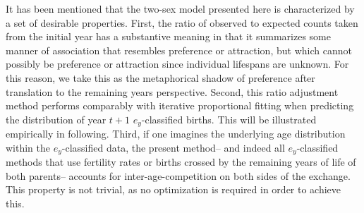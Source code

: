 
It has been mentioned that the two-sex model presented here is characterized by
a set of desirable properties. First, the ratio of observed to expected counts
taken from the initial year has a substantive meaning in that it summarizes
some manner of association that resembles preference or attraction, but which
cannot possibly be preference or attraction since individual lifespans are
unknown. For this reason, we take this as the metaphorical shadow of preference
after translation to the remaining years perspective. Second, this ratio adjustment 
method performs comparably with iterative proportional fitting when
predicting the distribution of year $t+1$ $e_y$-classified births. This will be illustrated
 empirically in following. Third, if one imagines the underlying age
 distribution within the $e_y$-classified data, the present method-- and indeed
all $e_y$-classified methods that use fertility rates or births crossed by the
remaining years of life of both parents-- accounts for
inter-age-competition on both sides of the exchange. This property is not
trivial, as no optimization is required in order to achieve this. 







